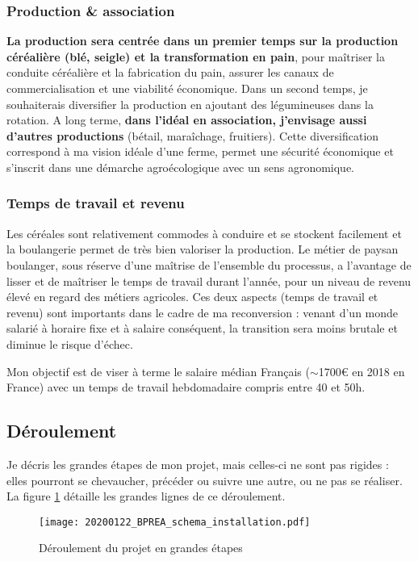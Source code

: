 \documentclass{article}
\begin{document}
\subsubsection*{Production \& association}

\textbf{La production sera centrée dans un premier temps sur la production céréalière (blé, seigle) et la transformation en pain}, pour maîtriser la conduite céréalière et la fabrication du pain, assurer les canaux de commercialisation et une viabilité économique. Dans un second temps, je souhaiterais diversifier la production en ajoutant des légumineuses dans la rotation. A long terme, \textbf{dans l'idéal en association, j'envisage aussi d'autres productions} (bétail, maraîchage, fruitiers). Cette diversification correspond à ma vision idéale d'une ferme, permet une sécurité économique et s'inscrit dans une démarche agroécologique avec un sens agronomique.

\subsubsection*{Temps de travail et revenu}

Les céréales sont relativement commodes à conduire et se stockent facilement et la boulangerie permet de très bien valoriser la production. Le métier de paysan boulanger, sous réserve d'une maîtrise de l'ensemble du processus, a l'avantage de lisser et de maîtriser le temps de travail durant l'année, pour un niveau de revenu élevé en regard des métiers agricoles. Ces deux aspects (temps de travail et revenu) sont importants dans le cadre de ma reconversion : venant d'un monde salarié à horaire fixe et à salaire conséquent, la transition sera moins brutale et diminue le risque d'échec. 

Mon objectif est de viser à terme le salaire médian Français ($\sim$1700\euro{} en 2018 en France) avec un temps de travail hebdomadaire compris entre 40 et 50h.

\subsection{Déroulement}

Je décris les grandes étapes de mon projet, mais celles-ci ne sont pas rigides : elles pourront se chevaucher, précéder ou suivre une autre, ou ne pas se réaliser. La figure \ref{fig:deroulement} détaille les grandes lignes de ce déroulement.

\begin{figure}[h!]
\centering
		\texttt{[image: 20200122\_BPREA\_schema\_installation.pdf]}
		\caption{Déroulement du projet en grandes étapes}
		\label{fig:deroulement}
\end{figure}
\end{document}
